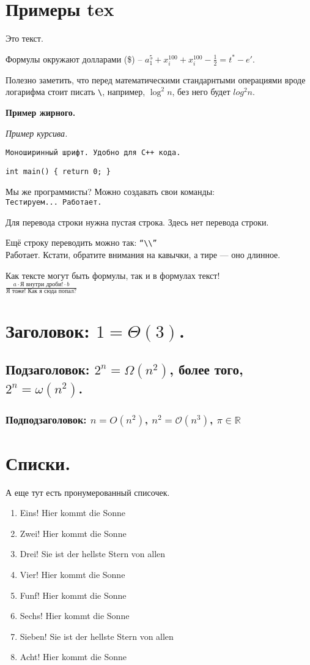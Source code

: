 \documentclass[12pt]{article} %
\newcommand{\Section}[1]{\section{#1}\vspace{-1.5em}\hspace*{\parindent}\unskip} %
\begin{document}
\Section{Примеры tex}

Это текст.

Формулы окружают долларами (\$) -- $a_1^5 + x^{100}_{i} + x_{i}^{100} - \frac{1}{2} = t^* - e'$.

Полезно заметить, что перед математическими стандарнтыми операциями вроде
логарифма стоит писать \texttt{\textbackslash}, например, $\log^2 n$, без него будет $log^2 n$.

{\bf Пример жирного.}

{\it Пример курсива.}

\texttt{Моноширинный шрифт. Удобно для C++ кода.}

\texttt{int main() \{ return 0; \}}

\def\t{\texttt} %
Мы же программисты? Можно создавать свои команды:\\

\t{Тестируем... Работает.}

Для перевода строки нужна пустая строка.
Здесь нет перевода строки.

Ещё строку переводить можно так: \texttt{``\textbackslash\textbackslash''}\\
Работает. Кстати, обратите внимания на кавычки, а тире --- оно длинное.

Как тексте могут быть формулы, так и в формулах текст!\\
$\frac{a \cdot \mbox{Я внутри дроби!} \cdot b}{\t{Я тоже! Как я сюда попал?}}$

\section{Заголовок: $1 = \Theta(3)$.}
\subsection{Подзаголовок: $2^n = \Omega(n^2)$, более того, $2^n = \omega(n^2)$.}
\subsubsection{Подподзаголовок: $n = O(n^2)$, $n^2 = \mathcal{O}(n^3)$, $\pi \in \mathbb{R}$} %

\Section{Списки.}

А еще тут есть пронумерованный списочек.
\begin{enumerate}
  \setlength{\parskip}{0pt} %
  \setlength{\itemsep}{0pt} %
  \item Eins! Hier kommt die Sonne
  \item Zwei! Hier kommt die Sonne
  \item Drei! Sie ist der hellste Stern von allen
  \item Vier! Hier kommt die Sonne
  \item Funf! Hier kommt die Sonne
  \item Sechs! Hier kommt die Sonne
  \item Sieben! Sie ist der hellste Stern von allen
  \item Acht! Hier kommt die Sonne
\end{enumerate}
\end{document}
